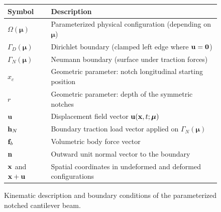 \begin{figure}[htbp]
{%
    }


    \vspace{0.4cm}
    \small
    \begin{tabular}{ll}
        \toprule
        \textbf{Symbol}                      & \textbf{Description}                                                   \\
        \midrule
        $\Omega(\boldsymbol{\mu})$           & Parameterized physical configuration (depending on $\boldsymbol{\mu}$) \\
        $\Gamma_D(\boldsymbol{\mu})$         & Dirichlet boundary (clamped left edge where $\mathbf{u} = \mathbf{0}$)     \\
        $\Gamma_N(\boldsymbol{\mu})$         & Neumann boundary (surface under traction forces)                       \\
        $x_c$                                & Geometric parameter: notch longitudinal starting position              \\
        $r$                                  & Geometric parameter: depth of the symmetric notches                   \\
        $\mathbf{u}$                           & Displacement field vector $\mathbf{u}(\mathbf{x}, t; \boldsymbol{\mu})$    \\
        $\mathbf{h}_N$                         & Boundary traction load vector applied on $\Gamma_N(\boldsymbol{\mu})$  \\
        $\mathbf{f}_b$                         & Volumetric body force vector                                           \\
        $\mathbf{n}$                           & Outward unit normal vector to the boundary                             \\
        $\mathbf{x}$ and $\mathbf{x} + \mathbf{u}$ & Spatial coordinates in undeformed and deformed configurations          \\
        \bottomrule
    \end{tabular}
    \caption{Kinematic description and boundary conditions of the parameterized notched cantilever beam.}
    \label{fig:continuum_kinematics}
\end{figure}


